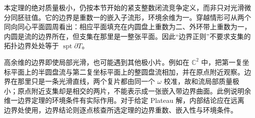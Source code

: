 本定理的绝对质量极小，仍按本节开始的紧支整数闭流竞争定义，而非只对光滑微分同胚驻值。它的边界是重数一的嵌入子流形，环境余维为一。穿越情形可从两个同向同心平面圆周看出：相应平面填充在内圆盘上重数为二、外环带上重数为一，内圆是流的边界所在，但支集在那里是一整张平面。因此“边界正则”不要求支集的拓扑边界处处等于 \(\operatorname{spt}\partial T\)。

\ProseParagraphBreak
高余维的边界即使局部光滑，也可能遇到其他极小片。例如在 \(\mathbb C^2\) 中，把第一复坐标平面上的半圆盘流与第二复坐标平面上的整圆盘流相加，并在原点附近观察。边界在那里只是一条光滑直线，两个复片都由同一个 \(\omega\) 校准，故和流局部质量极小；原点附近支集却是相交的两片，不能表示成一张嵌入带边界曲面。此例说明余维一边界定理的环境条件有实际作用。对于给定 Plateau 解，内部结论应在远离边界处使用，边界结论则逐点核查所选定理的边界重数、嵌入性与环境条件。
